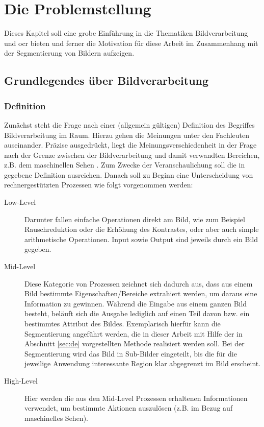 \chapter{Die Problemstellung}
\label{chap:prob}
	
	Dieses Kapitel soll eine grobe Einführung in die Thematiken Bildverarbeitung und \gls{ocr} bieten und ferner die Motivation für diese Arbeit im Zusammenhang mit der Segmentierung von Bildern aufzeigen.
	\section{Grundlegendes über Bildverarbeitung}
	\label{sec:bild-basics}
	
		\subsection{Definition}
		\label{sub:def-img-proc}
			Zunächst steht die Frage nach einer (allgemein gültigen) Definition des Begriffes Bildverarbeitung im Raum. Hierzu gehen die Meinungen unter den Fachleuten auseinander. Präzise ausgedrückt, liegt die Meinungsverschiedenheit in der Frage nach der Grenze zwischen der Bildverarbeitung und damit verwandten Bereichen, z.B. dem maschinellen Sehen \cite[S. 2]{gonzalez-woods}. Zum Zwecke der Veranschaulichung soll die in \cite[S. 2]{gonzalez-woods} gegebene Definition ausreichen. Danach soll zu Beginn eine Unterscheidung von rechnergestützten Prozessen wie folgt vorgenommen werden:
			\begin{description}
				\item[Low-Level] Darunter fallen einfache Operationen direkt am Bild, wie zum Beispiel Rauschreduktion oder die Erhöhung des Kontrastes, oder aber auch simple arithmetische Operationen. Input sowie Output sind jeweils durch ein Bild gegeben.
				\item[Mid-Level] Diese Kategorie von Prozessen zeichnet sich dadurch aus, dass aus einem Bild bestimmte Eigenschaften/Bereiche extrahiert werden, um daraus eine Information zu gewinnen. Während die Eingabe aus einem ganzen Bild besteht, beläuft sich die Ausgabe lediglich auf einen Teil davon bzw. ein bestimmtes Attribut des Bildes. Exemplarisch hierfür kann die Segmentierung angeführt werden, die in dieser Arbeit mit Hilfe der in Abschnitt \ref{sec:de} vorgestellten Methode realisiert werden soll. Bei der Segmentierung wird das Bild in Sub-Bilder eingeteilt, bis die für die jeweilige Anwendung interessante Region klar abgegrenzt im Bild erscheint.
				\item[High-Level] Hier werden die aus den Mid-Level Prozessen erhaltenen Informationen verwendet, um bestimmte Aktionen auszulösen (z.B. im Bezug auf maschinelles Sehen).
			\end{description}
